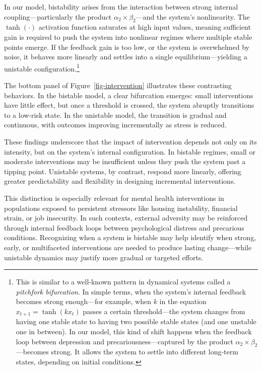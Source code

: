 \documentclass[
]{article}
\begin{document}
In our model, bistability arises from the interaction between strong
internal coupling---particularly the product
\(\alpha_2 \times \beta_2\)---and the system's nonlinearity. The
\(\tanh(\cdot)\) activation function saturates at high input values,
meaning sufficient gain is required to push the system into nonlinear
regimes where multiple stable points emerge. If the feedback gain is too
low, or the system is overwhelmed by noise, it behaves more linearly and
settles into a single equilibrium---yielding a unistable
configuration.\footnote{This is similar to a well-known pattern in
  dynamical systems called a \emph{pitchfork bifurcation}. In simple
  terms, when the system's internal feedback becomes strong enough---for
  example, when \(k\) in the equation \(x_{t+1} = \tanh(k x_t)\) passes
  a certain threshold---the system changes from having one stable state
  to having two possible stable states (and one unstable one in
  between). In our model, this kind of shift happens when the feedback
  loop between depression and precariousness---captured by the product
  \(\alpha_2 \times \beta_2\)---becomes strong. It allows the system to
  settle into different long-term states, depending on initial
  conditions.}

The bottom panel of Figure~\ref{fig-intervention} illustrates these
contrasting behaviors. In the bistable model, a clear bifurcation
emerges: small interventions have little effect, but once a threshold is
crossed, the system abruptly transitions to a low-risk state. In the
unistable model, the transition is gradual and continuous, with outcomes
improving incrementally as stress is reduced.

These findings underscore that the impact of intervention depends not
only on its intensity, but on the system's internal configuration. In
bistable regimes, small or moderate interventions may be insufficient
unless they push the system past a tipping point. Unistable systems, by
contrast, respond more linearly, offering greater predictability and
flexibility in designing incremental interventions.

This distinction is especially relevant for mental health interventions
in populations exposed to persistent stressors like housing instability,
financial strain, or job insecurity. In such contexts, external
adversity may be reinforced through internal feedback loops between
psychological distress and precarious conditions. Recognizing when a
system is bistable may help identify when strong, early, or multifaceted
interventions are needed to produce lasting change---while unistable
dynamics may justify more gradual or targeted efforts.
\end{document}
